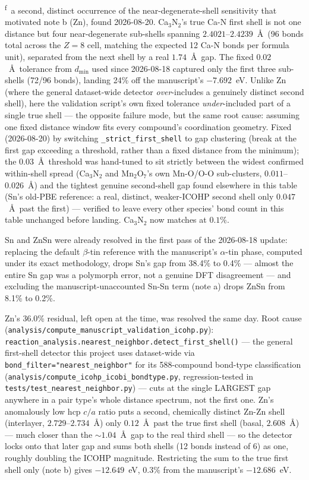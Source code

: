 \noindent\textsuperscript{f}~a second, distinct occurrence of the near-degenerate-shell sensitivity that motivated note b (Zn), found 2026-08-20. Ca$_3$N$_2$'s true Ca-N first shell is not one distance but four near-degenerate sub-shells spanning $2.4021$--$2.4239$~\AA\ (96 bonds total across the $Z=8$ cell, matching the expected 12 Ca-N bonds per formula unit), separated from the next shell by a real $1.74$~\AA\ gap. The fixed $0.02$~\AA\ tolerance from $d_{\min}$ used since 2026-08-18 captured only the first three sub-shells (72/96 bonds), landing 24\% off the manuscript's $-7.692$~eV. Unlike Zn (where the general dataset-wide detector \emph{over}-includes a genuinely distinct second shell), here the validation script's own fixed tolerance \emph{under}-included part of a single true shell --- the opposite failure mode, but the same root cause: assuming one fixed distance window fits every compound's coordination geometry. Fixed (2026-08-20) by switching \texttt{\_strict\_first\_shell} to gap clustering (break at the first gap exceeding a threshold, rather than a fixed distance from the minimum); the $0.03$~\AA\ threshold was hand-tuned to sit strictly between the widest confirmed within-shell spread (Ca$_3$N$_2$ and Mn$_2$O$_7$'s own Mn-O/O-O sub-clusters, $0.011$--$0.026$~\AA) and the tightest genuine second-shell gap found elsewhere in this table (Sn's old-PBE reference: a real, distinct, weaker-ICOHP second shell only $0.047$~\AA\ past the first) --- verified to leave every other species' bond count in this table unchanged before landing. Ca$_3$N$_2$ now matches at $0.1\%$.

Sn and ZnSn were already resolved in the first pass of the 2026-08-18
update: replacing the default $\beta$-tin reference with the
manuscript's $\alpha$-tin phase, computed under its exact methodology,
drops Sn's gap from 38.4\% to 0.4\% --- almost the entire Sn gap was a
polymorph error, not a genuine DFT disagreement --- and excluding the
manuscript-unaccounted Sn-Sn term (note a) drops ZnSn from 8.1\% to
0.2\%.

Zn's 36.0\% residual, left open at the time, was resolved the same day.
Root cause (\texttt{analysis/compute\_manuscript\_validation\_icohp.py}):
\texttt{reaction\_analysis.nearest\_neighbor.detect\_first\_shell()} ---
the general first-shell detector this project uses dataset-wide via
\texttt{bond\_filter="nearest\_neighbor"} for its 588-compound bond-type
classification (\texttt{analysis/compute\_icohp\_icobi\_bondtype.py},
regression-tested in \texttt{tests/test\_nearest\_neighbor.py}) --- cuts
at the single LARGEST gap anywhere in a pair type's whole distance
spectrum, not the first one. Zn's anomalously low hcp $c/a$ ratio puts a
second, chemically distinct Zn-Zn shell (interlayer, $2.729$--$2.734$~\AA)
only $0.12$~\AA\ past the true first shell (basal, $2.608$~\AA) ---
much closer than the $\sim\!1.04$~\AA\ gap to the real third shell ---
so the detector locks onto that later gap and sums both shells (12
bonds instead of 6) as one, roughly doubling the ICOHP magnitude.
Restricting the sum to the true first shell only (note b) gives
$-12.649$~eV, $0.3\%$ from the manuscript's $-12.686$~eV.

